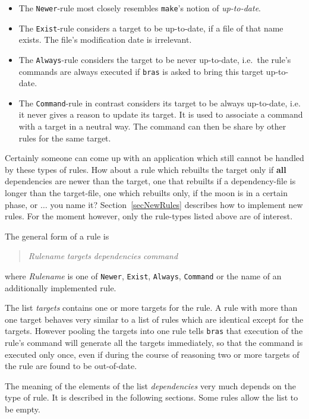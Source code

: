 \documentclass[12pt]{article}
\newcommand{\bras}{\texttt{bras}}
\newcommand{\make}{\texttt{make}}
\begin{document}
\begin{itemize}
\item 
The \texttt{Newer}-rule most closely resembles \make's notion of
\textit{up-to-date}.
\item 
The \texttt{Exist}-rule considers a target to be up-to-date,
if a file of that name exists. The file's modification date is irrelevant.
\item 
The \texttt{Always}-rule considers the target to be never
up-to-date, i.e.\ the rule's commands are always executed if
\bras{} is asked to bring this target up-to-date.
\item
The \texttt{Command}-rule in contrast considers its target to be always
up-to-date, i.e. it never gives a reason to update its target. It is
used to associate a command with a target in a neutral way. The
command can then be share by other rules for the same target.
\end{itemize}

Certainly someone can come up with an application which still cannot
be handled by these types of rules. How about a rule which rebuilts
the target only if \textbf{all} dependencies are newer than the
target, one that rebuilts if a dependency-file is longer than the
target-file, one which rebuilts only, if the moon is in a certain
phase, or $\ldots$ you name it?  Section~\ref{secNewRules} describes
how to implement new rules. For the moment however, only the
rule-types listed above are of interest.

The general form of a rule is
\begin{quote}
\textit{Rulename} \textit{targets} \textit{dependencies} \textit{command}
\end{quote}
where \textit{Rulename} is one of \texttt{Newer}, \texttt{Exist},
\texttt{Always}, \texttt{Command} or the name of an additionally
implemented rule. 

The list \textit{targets} contains one or more targets for the rule. A
rule with more than one target behaves very similar to a list of rules
which are identical except for the targets. However pooling the
targets into one rule tells \bras{} that execution of the rule's
command will generate all the targets immediately, so that the command
is executed only once, even if during the course of reasoning two or
more targets of the rule are found to be out-of-date.

The meaning of the elements of the list \textit{dependencies} very
much depends on the type of rule. It is described in the following
sections. Some rules allow the list to be empty.
\end{document}
